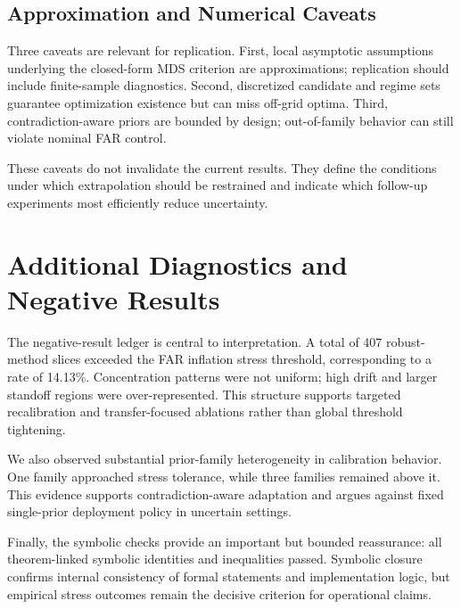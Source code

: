 \subsection{Approximation and Numerical Caveats}
Three caveats are relevant for replication. First, local asymptotic assumptions underlying the closed-form MDS criterion are approximations; replication should include finite-sample diagnostics. Second, discretized candidate and regime sets guarantee optimization existence but can miss off-grid optima. Third, contradiction-aware priors are bounded by design; out-of-family behavior can still violate nominal FAR control.

These caveats do not invalidate the current results. They define the conditions under which extrapolation should be restrained and indicate which follow-up experiments most efficiently reduce uncertainty.

\section{Additional Diagnostics and Negative Results}\label{sec:appendix_negative}
The negative-result ledger is central to interpretation. A total of 407 robust-method slices exceeded the FAR inflation stress threshold, corresponding to a rate of 14.13\%. Concentration patterns were not uniform; high drift and larger standoff regions were over-represented. This structure supports targeted recalibration and transfer-focused ablations rather than global threshold tightening.

We also observed substantial prior-family heterogeneity in calibration behavior. One family approached stress tolerance, while three families remained above it. This evidence supports contradiction-aware adaptation and argues against fixed single-prior deployment policy in uncertain settings.

Finally, the symbolic checks provide an important but bounded reassurance: all theorem-linked symbolic identities and inequalities passed. Symbolic closure confirms internal consistency of formal statements and implementation logic, but empirical stress outcomes remain the decisive criterion for operational claims.

